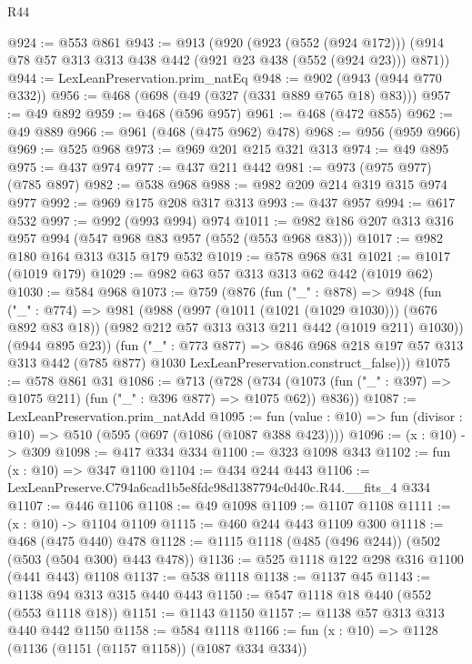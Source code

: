 \begin{lexlean}{R44}
\begin{coremodule}
@924 := @553 @861
@943 := @913
    (@920
      (@923 (@552 (@924 @172)))
      (@914 @78 @57 @313 @313 @438 @442 (@921 @23 @438 (@552 (@924 @23))) @871))
@944 := LexLeanPreservation.prim_natEq
@948 := @902 (@943 (@944 @770 @332))
@956 := @468 (@698 (@49 (@327 (@331 @889 @765 @18) @83)))
@957 := @49 @892
@959 := @468 (@596 @957)
@961 := @468 (@472 @855)
@962 := @49 @889
@966 := @961 (@468 (@475 @962) @478)
@968 := @956 (@959 @966)
@969 := @525 @968
@973 := @969 @201 @215 @321 @313
@974 := @49 @895
@975 := @437 @974
@977 := @437 @211 @442
@981 := @973 (@975 @977) (@785 @897)
@982 := @538 @968
@988 := @982 @209 @214 @319 @315 @974 @977
@992 := @969 @175 @208 @317 @313
@993 := @437 @957
@994 := @617 @532
@997 := @992 (@993 @994) @974
@1011 := @982 @186 @207 @313 @316 @957 @994 (@547 @968 @83 @957 (@552 (@553 @968 @83)))
@1017 := @982 @180 @164 @313 @315 @179 @532
@1019 := @578 @968 @31
@1021 := @1017 (@1019 @179)
@1029 := @982 @63 @57 @313 @313 @62 @442 (@1019 @62)
@1030 := @584 @968
@1073 := @759
    (@876
      (fun ("_" : @878) =>
      @948
        (fun ("_" : @774) =>
        @981
          (@988
            (@997 (@1011 (@1021 (@1029 @1030))) (@676 @892 @83 @18))
            (@982 @212 @57 @313 @313 @211 @442 (@1019 @211) @1030))
          (@944 @895 @23))
        (fun ("_" : @773 @877) =>
        @846
          @968
          @218
          @197
          @57
          @313
          @313
          @442
          (@785 @877)
          @1030
          LexLeanPreservation.construct_false)))
@1075 := @578 @861 @31
@1086 := @713
    (@728 (@734 (@1073 (fun ("_" : @397) => @1075 @211) (fun ("_" : @396 @877) => @1075 @62)) @836))
@1087 := LexLeanPreservation.prim_natAdd
@1095 := fun (value : @10) => fun (divisor : @10) => @510 (@595 (@697 (@1086 (@1087 @388 @423))))
@1096 := (x : @10) -> @309
@1098 := @417 @334 @334
@1100 := @323 @1098 @343
@1102 := fun (x : @10) => @347 @1100
@1104 := @434 @244 @443
@1106 := LexLeanPreserve.C794a6cad1b5e8fdc98d1387794c0d40c.R44.__fits_4 @334
@1107 := @446 @1106
@1108 := @49 @1098
@1109 := @1107 @1108
@1111 := (x : @10) -> @1104 @1109
@1115 := @460 @244 @443 @1109 @300
@1118 := @468 (@475 @440) @478
@1128 := @1115 @1118 (@485 (@496 @244)) (@502 (@503 (@504 @300) @443 @478))
@1136 := @525 @1118 @122 @298 @316 @1100 (@441 @443) @1108
@1137 := @538 @1118
@1138 := @1137 @45
@1143 := @1138 @94 @313 @315 @440 @443
@1150 := @547 @1118 @18 @440 (@552 (@553 @1118 @18))
@1151 := @1143 @1150
@1157 := @1138 @57 @313 @313 @440 @442 @1150
@1158 := @584 @1118
@1166 := fun (x : @10) => @1128 (@1136 (@1151 (@1157 @1158)) (@1087 @334 @334))

\end{coremodule}
\end{lexlean}
